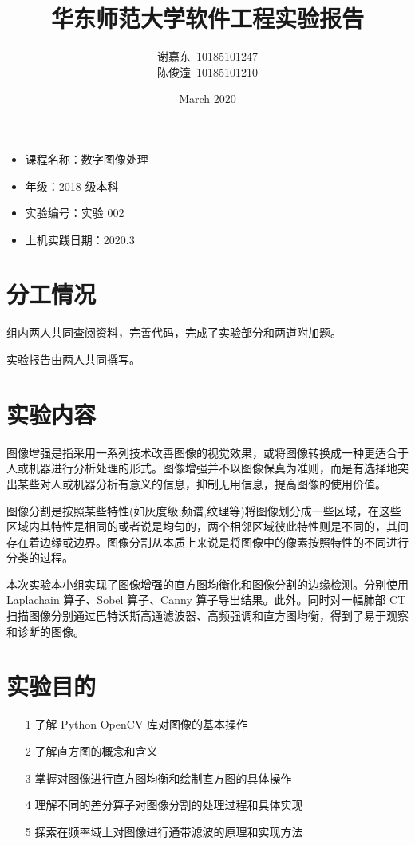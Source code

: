 \documentclass[11pt]{ctexart}
\title{华东师范大学软件工程实验报告}
\author{谢嘉东\ 10185101247\\陈俊潼\ 10185101210}
\date{March 2020}
\begin{document}
\maketitle

\thispagestyle{empty}

\begin{itemize}
    \item 课程名称：数字图像处理
    \item 年级：2018 级本科
    \item 实验编号：实验 002
    \item 上机实践日期：2020.3
\end{itemize}

\tableofcontents

\thispagestyle{empty}

\newpage

\section{分工情况}

组内两人共同查阅资料，完善代码，完成了实验部分和两道附加题。

实验报告由两人共同撰写。

\section{实验内容}

图像增强是指采用一系列技术改善图像的视觉效果，或将图像转换成一种更适合于人或机器进行分析处理的形式。图像增强并不以图像保真为准则，而是有选择地突出某些对人或机器分析有意义的信息，抑制无用信息，提高图像的使用价值。

图像分割是按照某些特性(如灰度级,频谱,纹理等)将图像划分成一些区域，在这些区域内其特性是相同的或者说是均匀的，两个相邻区域彼此特性则是不同的，其间存在着边缘或边界。图像分割从本质上来说是将图像中的像素按照特性的不同进行分类的过程。

本次实验本小组实现了图像增强的直方图均衡化和图像分割的边缘检测。分别使用 Laplachain 算子、Sobel 算子、Canny 算子导出结果。此外。同时对一幅肺部 CT 扫描图像分别通过巴特沃斯高通滤波器、高频强调和直方图均衡，得到了易于观察和诊断的图像。

\section{实验目的}

\begin{itemize}
    \item [1] 了解 Python OpenCV 库对图像的基本操作
    \item [2] 了解直方图的概念和含义
    \item [3] 掌握对图像进行直方图均衡和绘制直方图的具体操作
    \item [4] 理解不同的差分算子对图像分割的处理过程和具体实现
    \item [5] 探索在频率域上对图像进行通带滤波的原理和实现方法
\end{itemize}
\end{document}
